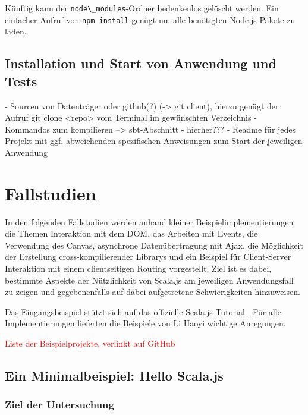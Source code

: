 \documentclass[a4paper, 12pt, hidelinks, listof=totoc, listoftables=totoc, bibliography=totoc]{scrreprt}
\newcommand{\code}[1]{\lstinline[language=Scala, style=inline]|#1|}
\newcommand{\TODO}[1]{\textcolor{red}{#1}\newline}
\begin{document}
Künftig kann der \code{node\_modules}-Ordner bedenkenlos gelöscht werden. Ein einfacher Aufruf von \code{npm install} genügt um alle benötigten Node.js-Pakete zu laden.


\section{Installation und Start von Anwendung und Tests}

- Sourcen von Datenträger oder github(?) (-> git client), hierzu genügt der Aufruf git clone <repo> vom Terminal im gewünschten Verzeichnis
- Kommandos zum kompilieren --> sbt-Abschnitt - hierher???
- Readme für jedes Projekt mit ggf. abweichenden spezifischen Anweisungen zum Start der jeweiligen Anwendung


\chapter{Fallstudien}\label{chap:case-studies}

In den folgenden Fallstudien werden anhand kleiner Beispielimplementierungen die Themen Interaktion mit dem DOM, das Arbeiten mit Events, die Verwendung des Canvas, asynchrone Datenübertragung mit Ajax, die Möglichkeit der Erstellung cross-kompilierender Librarys und ein Beispiel für Client-Server Interaktion mit einem clientseitigen Routing vorgestellt. Ziel ist es dabei, bestimmte Aspekte der Nützlichkeit von Scala.js am jeweiligen Anwendungsfall zu zeigen und gegebenenfalls auf dabei aufgetretene Schwierigkeiten hinzuweisen.

Das Eingangsbeispiel stützt sich auf das offizielle Scala.js-Tutorial \cite{scalajs.SJT}. Für alle Implementierungen lieferten die Beispiele von Li Haoyi \cite{haoyi.HOS} wichtige Anregungen.

\TODO{Liste der Beispielprojekte, verlinkt auf GitHub}




\section{Ein Minimalbeispiel: Hello Scala.js}



\subsection{Ziel der Untersuchung}
\end{document}
